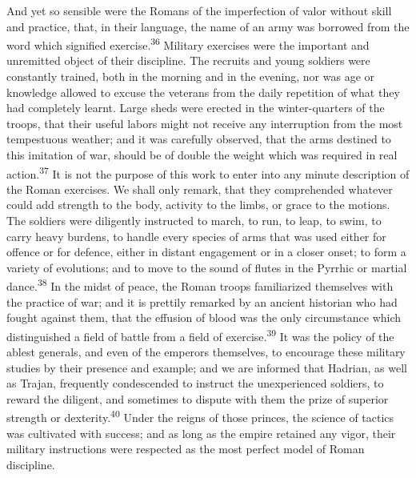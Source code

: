 

And yet so sensible were the Romans of the imperfection of valor
without skill and practice, that, in their language, the name of
an army was borrowed from the word which signified exercise.\textsuperscript{36}
Military exercises were the important and unremitted object of
their discipline. The recruits and young soldiers were constantly
trained, both in the morning and in the evening, nor was age or
knowledge allowed to excuse the veterans from the daily
repetition of what they had completely learnt. Large sheds were
erected in the winter-quarters of the troops, that their useful
labors might not receive any interruption from the most
tempestuous weather; and it was carefully observed, that the arms
destined to this imitation of war, should be of double the weight
which was required in real action.\textsuperscript{37} It is not the purpose of
this work to enter into any minute description of the Roman
exercises. We shall only remark, that they comprehended whatever
could add strength to the body, activity to the limbs, or grace
to the motions. The soldiers were diligently instructed to march,
to run, to leap, to swim, to carry heavy burdens, to handle every
species of arms that was used either for offence or for defence,
either in distant engagement or in a closer onset; to form a
variety of evolutions; and to move to the sound of flutes in the
Pyrrhic or martial dance.\textsuperscript{38} In the midst of peace, the Roman
troops familiarized themselves with the practice of war; and it
is prettily remarked by an ancient historian who had fought
against them, that the effusion of blood was the only
circumstance which distinguished a field of battle from a field
of exercise.\textsuperscript{39} It was the policy of the ablest generals, and
even of the emperors themselves, to encourage these military
studies by their presence and example; and we are informed that
Hadrian, as well as Trajan, frequently condescended to instruct
the unexperienced soldiers, to reward the diligent, and sometimes
to dispute with them the prize of superior strength or dexterity.\textsuperscript{40}
Under the reigns of those princes, the science of tactics was
cultivated with success; and as long as the empire retained any
vigor, their military instructions were respected as the most
perfect model of Roman discipline.

